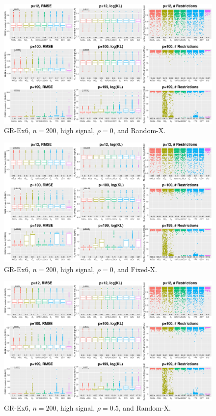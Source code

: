 \clearpage
\begin{figure}[!ht]
\centering
\includegraphics[width=\textwidth]{figures/supplement/randomx_GR-Ex6_n200_hsnr_rho0.eps}
\caption{GR-Ex6, $n=200$, high signal, $\rho=0$, and Random-X.}
\end{figure}
\begin{figure}[!ht]
\centering
\includegraphics[width=\textwidth]{figures/supplement/fixedx_GR-Ex6_n200_hsnr_rho0.eps}
\caption{GR-Ex6, $n=200$, high signal, $\rho=0$, and Fixed-X.}
\end{figure}
\clearpage
\begin{figure}[!ht]
\centering
\includegraphics[width=\textwidth]{figures/supplement/randomx_GR-Ex6_n200_hsnr_rho05.eps}
\caption{GR-Ex6, $n=200$, high signal, $\rho=0.5$, and Random-X.}
\end{figure}

